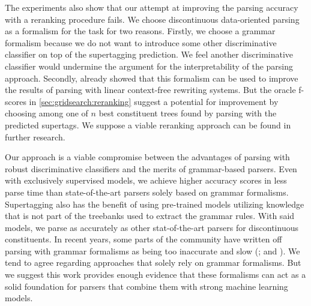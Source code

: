 \documentclass[../document.tex]{subfiles}
\begin{document}
    The experiments also show that our attempt at improving the parsing accuracy with a reranking procedure fails.
    We choose discontinuous data-oriented parsing as a formalism for the task for two reasons.
        Firstly, we choose a grammar formalism because we do not want to introduce some other discriminative classifier on top of the supertagging prediction.
        We feel another discriminative classifier would undermine the argument for the interpretability of the parsing approach.
        Secondly, \citet{CraSchBod16} already showed that this formalism can be used to improve the results of parsing with linear context-free rewriting systems.
    But the oracle f-scores in \cref{sec:gridsearch:reranking} suggest a potential for improvement by choosing among one of \(n\) best constituent trees found by parsing with the predicted supertags.
    We suppose a viable reranking approach can be found in further research.

    Our approach is a viable compromise between the advantages of parsing with robust discriminative classifiers and the merits of grammar-based parsers.
    Even with exclusively supervised models, we achieve higher accuracy scores in less parse time than state-of-the-art parsers solely based on grammar formalisms.
    Supertagging also has the benefit of using pre-trained models utilizing knowledge that is not part of the treebanks used to extract the grammar rules.
    With said models, we parse as accurately as other stat-of-the-art parsers for discontinuous constituents.
    In recent years, some parts of the  community have written off parsing with grammar formalisms as being too inaccurate and slow (\citealp[Section~1]{StaSte20}; and \citealp[Section~10]{zhang2020survey}).
    We tend to agree regarding approaches that solely rely on grammar formalisms.
    But we suggest this work provides enough evidence that these formalisms can act as a solid foundation for parsers that combine them with strong machine learning models.
\end{document}
